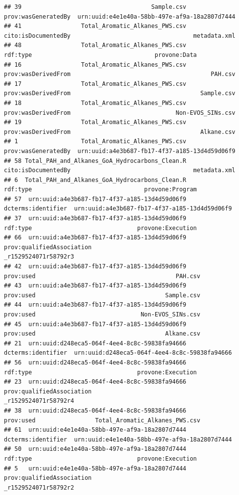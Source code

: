 \documentclass[]{article}
\begin{document}
\begin{verbatim}
## 39                                     Sample.csv       prov:wasGeneratedBy  urn:uuid:e4e1e40a-58bb-497e-af9a-18a2807d7444
## 41                 Total_Aromatic_Alkanes_PWS.csv       cito:isDocumentedBy                                   metadata.xml
## 48                 Total_Aromatic_Alkanes_PWS.csv                  rdf:type                                   provone:Data
## 16                 Total_Aromatic_Alkanes_PWS.csv       prov:wasDerivedFrom                                        PAH.csv
## 17                 Total_Aromatic_Alkanes_PWS.csv       prov:wasDerivedFrom                                     Sample.csv
## 18                 Total_Aromatic_Alkanes_PWS.csv       prov:wasDerivedFrom                              Non-EVOS_SINs.csv
## 19                 Total_Aromatic_Alkanes_PWS.csv       prov:wasDerivedFrom                                     Alkane.csv
## 1                  Total_Aromatic_Alkanes_PWS.csv       prov:wasGeneratedBy  urn:uuid:a4e3b687-fb17-4f37-a185-13d4d59d06f9
## 58 Total_PAH_and_Alkanes_GoA_Hydrocarbons_Clean.R       cito:isDocumentedBy                                   metadata.xml
## 6  Total_PAH_and_Alkanes_GoA_Hydrocarbons_Clean.R                  rdf:type                                provone:Program
## 57  urn:uuid:a4e3b687-fb17-4f37-a185-13d4d59d06f9        dcterms:identifier  urn:uuid:a4e3b687-fb17-4f37-a185-13d4d59d06f9
## 37  urn:uuid:a4e3b687-fb17-4f37-a185-13d4d59d06f9                  rdf:type                              provone:Execution
## 66  urn:uuid:a4e3b687-fb17-4f37-a185-13d4d59d06f9 prov:qualifiedAssociation                           _r1529524071r58792r3
## 42  urn:uuid:a4e3b687-fb17-4f37-a185-13d4d59d06f9                 prov:used                                        PAH.csv
## 43  urn:uuid:a4e3b687-fb17-4f37-a185-13d4d59d06f9                 prov:used                                     Sample.csv
## 44  urn:uuid:a4e3b687-fb17-4f37-a185-13d4d59d06f9                 prov:used                              Non-EVOS_SINs.csv
## 45  urn:uuid:a4e3b687-fb17-4f37-a185-13d4d59d06f9                 prov:used                                     Alkane.csv
## 21  urn:uuid:d248eca5-064f-4ee4-8c8c-59838fa94666        dcterms:identifier  urn:uuid:d248eca5-064f-4ee4-8c8c-59838fa94666
## 56  urn:uuid:d248eca5-064f-4ee4-8c8c-59838fa94666                  rdf:type                              provone:Execution
## 23  urn:uuid:d248eca5-064f-4ee4-8c8c-59838fa94666 prov:qualifiedAssociation                           _r1529524071r58792r4
## 38  urn:uuid:d248eca5-064f-4ee4-8c8c-59838fa94666                 prov:used                 Total_Aromatic_Alkanes_PWS.csv
## 61  urn:uuid:e4e1e40a-58bb-497e-af9a-18a2807d7444        dcterms:identifier  urn:uuid:e4e1e40a-58bb-497e-af9a-18a2807d7444
## 50  urn:uuid:e4e1e40a-58bb-497e-af9a-18a2807d7444                  rdf:type                              provone:Execution
## 5   urn:uuid:e4e1e40a-58bb-497e-af9a-18a2807d7444 prov:qualifiedAssociation                           _r1529524071r58792r2
\end{verbatim}
\end{document}
